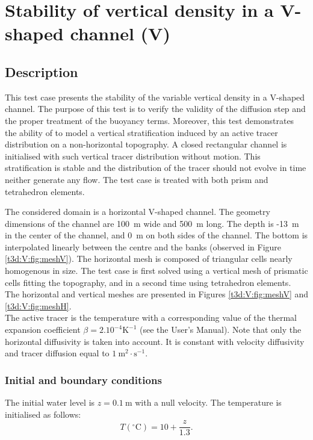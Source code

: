 \chapter{Stability of vertical density in a V-shaped channel (V)}

\section{Description}
\bigskip
This test case presents the stability of the variable vertical 
density in a V-shaped channel. The purpose of this test is to verify the 
validity of the diffusion step and the proper treatment of the buoyancy terms. 
Moreover, this test demonstrates the ability of  
to model a vertical stratification induced by an active tracer 
distribution on a non-horizontal topography. A closed rectangular channel 
is initialised with such vertical tracer distribution without motion. 
This stratification is stable and the distribution of the tracer should 
not evolve in time neither generate any flow. The test case is treated
 with both prism and tetrahedron elements.

\bigskip
The considered domain is a horizontal V-shaped channel. 
The geometry dimensions of the channel are 100~m wide and 500~m long. 
The depth is -13~m in the center of the channel, and 0~m on both sides of the channel. 
The bottom is interpolated linearly between the centre and the banks 
(observed in Figure \ref{t3d:V:fig:meshV}).  The horizontal mesh is composed of triangular 
cells nearly homogenous in size. The test case is first solved using 
a vertical mesh of prismatic cells fitting the topography, and in 
a second time using tetrahedron elements. The horizontal and vertical meshes 
are presented in Figures \ref{t3d:V:fig:meshV} and \ref{t3d:V:fig:meshH}.\\
The active tracer is the temperature with a corresponding value of the thermal 
expansion coefficient $\beta = 2.10^{-4}\text{K}^{-1}$ (see the User's Manual). 
Note that only the horizontal diffusivity is taken into account. It is constant 
with velocity diffusivity and tracer diffusion equal to $1~\text{m}^2\cdot\text{s}^{-1}$.

\subsection{Initial and boundary conditions}
\bigskip
The initial water level is $z = 0.1~\text{m}$ with a null velocity.
The temperature is initialised as follows: 
\begin{equation*}
T (^\circ\text{C}) = 10 + \displaystyle\frac{z}{1.3}.
\end{equation*}

